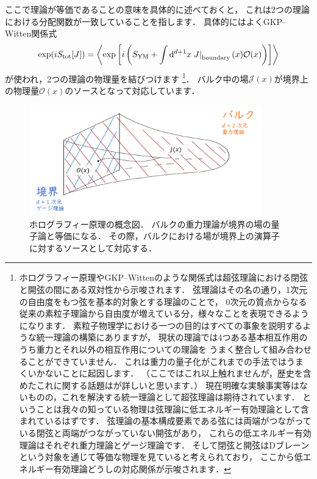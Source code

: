 \documentclass[b5paper,11pt,dvipdfmx]{jsarticle}
\numberwithin{equation}{section}
\theoremstyle{definition}
\begin{document}
ここで理論が等価であることの意味を具体的に述べておくと，
これは2つの理論における分配関数が一致していることを指します．
具体的にはよくGKP--Witten関係式\cite{Gubser98,Witten98}
\begin{equation}
    \exp(i S_{\text{tot}}[J])
    = \ev{\exp\left[ i \left( S_{\text{YM}}
    + \int \dd^{d+1} x \left. J \right|_{\text{boundary}} (x) \mathcal{O}(x) \right)\right]}
\end{equation}
が使われ，2つの理論の物理量を結びつけます
\footnote{ホログラフィー原理やGKP--Wittenのような関係式は超弦理論における閉弦と開弦の間にある双対性から示唆されます．
弦理論はその名の通り，1次元の自由度をもつ弦を基本的対象とする理論のことで，
0次元の質点からなる従来の素粒子理論から自由度が増えている分，様々なことを表現できるようになります．
素粒子物理学における一つの目的はすべての事象を説明するような統一理論の構築にありますが，
現状の理論では4つある基本相互作用のうち重力とそれ以外の相互作用についての理論を
うまく整合して組み合わせることができていません．
これは重力の量子化がこれまでの手法ではうまくいかないことに起因します．
（ここではこれ以上触れませんが，歴史を含めたこれに関する話題は\cite{Yoneya21}が詳しいと思います．）
現在明確な実験事実等はないものの，これを解決する統一理論として超弦理論は期待されています．
ということは我々の知っている物理は弦理論に低エネルギー有効理論として含まれているはずです．
弦理論の基本構成要素である弦には両端がつながっている閉弦と両端がつながっていない開弦があり，
これらの低エネルギー有効理論はそれぞれ重力理論とゲージ理論です．
そして閉弦と開弦はDブレーンという対象を通じて等価な物理を見ていると考えられており，
ここから低エネルギー有効理論どうしの対応関係が示唆されます．}．
バルク中の場$\mathcal{J}(x)$が境界上の物理量$\mathcal{O}(x)$のソースとなって対応しています．
\begin{figure}[t]
    \centering
    \includegraphics[width=0.9\textwidth]{holography.png}
    \caption{ホログラフィー原理の概念図．
    バルクの重力理論が境界の場の量子論と等価になる．
    その際，バルクにおける場が境界上の演算子に対するソースとして対応する．}
    \label{fig:holography}
\end{figure}
\end{document}
